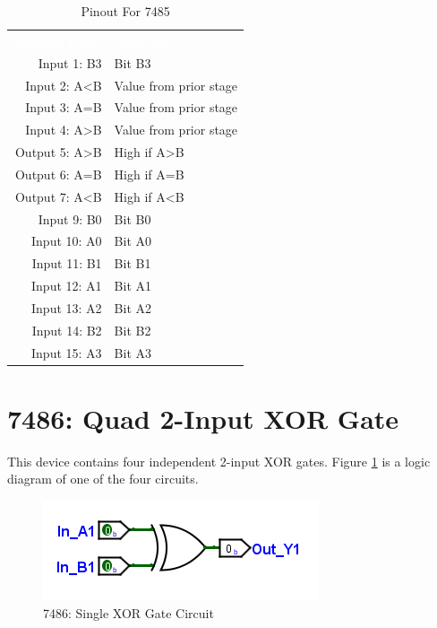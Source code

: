 \begin{table}[H]
	\sffamily
	\newcommand{\head}[1]{\textcolor{white}{\textbf{#1}}}		
	\begin{center}
		\begin{tabular}{rl} 
			\rowcolor{black!75}
			\head{Logisim Label} & \head{Function} \\
			Input 1: B3   & Bit B3                 \\
			Input 2: A<B  & Value from prior stage \\
			Input 3: A=B  & Value from prior stage \\
			Input 4: A>B  & Value from prior stage \\
			Output 5: A>B & High if A>B            \\
			Output 6: A=B & High if A=B            \\
			Output 7: A<B & High if A<B            \\
			Input 9: B0   & Bit B0                 \\
			Input 10: A0  & Bit A0                 \\
			Input 11: B1  & Bit B1                 \\
			Input 12: A1  & Bit A1                 \\
			Input 13: A2  & Bit A2                 \\
			Input 14: B2  & Bit B2                 \\
			Input 15: A3  & Bit A3                 \\
		\end{tabular}
	\end{center}
	\caption{Pinout For 7485}
	\label{tab:50-7485}
\end{table}

\section{7486: Quad 2-Input XOR Gate}

This device contains four independent 2-input XOR gates. Figure \ref{fig:50-7486} is a logic diagram of one of the four circuits.

\begin{figure}[H]
	\centering
	\includegraphics{gfx/50-7486}
	\caption{7486: Single XOR Gate Circuit}
	\label{fig:50-7486}
\end{figure}

